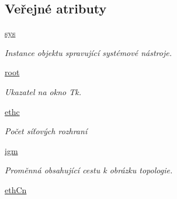 \subsection*{Veřejné atributy}
\begin{DoxyCompactItemize}
\item 
\hypertarget{classcloseSetup_1_1App_a29e3a5f52ef638873f13f1e1dc3b03f2}{\hyperlink{classcloseSetup_1_1App_a29e3a5f52ef638873f13f1e1dc3b03f2}{sys}}\label{df/df9/classcloseSetup_1_1App_a29e3a5f52ef638873f13f1e1dc3b03f2}

\begin{DoxyCompactList}\small\item\em Instance objektu spravující systémové nástroje. \end{DoxyCompactList}\item 
\hypertarget{classcloseSetup_1_1App_aa89fd74d63463734d14e222fe2296815}{\hyperlink{classcloseSetup_1_1App_aa89fd74d63463734d14e222fe2296815}{root}}\label{df/df9/classcloseSetup_1_1App_aa89fd74d63463734d14e222fe2296815}

\begin{DoxyCompactList}\small\item\em Ukazatel na okno Tk. \end{DoxyCompactList}\item 
\hypertarget{classcloseSetup_1_1App_a8d30b3f58f498caf6da5a5df32f8b24a}{\hyperlink{classcloseSetup_1_1App_a8d30b3f58f498caf6da5a5df32f8b24a}{ethc}}\label{df/df9/classcloseSetup_1_1App_a8d30b3f58f498caf6da5a5df32f8b24a}

\begin{DoxyCompactList}\small\item\em Počet síťových rozhraní \end{DoxyCompactList}\item 
\hypertarget{classcloseSetup_1_1App_af865322161774fe99b14bb037fa9dc87}{\hyperlink{classcloseSetup_1_1App_af865322161774fe99b14bb037fa9dc87}{igm}}\label{df/df9/classcloseSetup_1_1App_af865322161774fe99b14bb037fa9dc87}

\begin{DoxyCompactList}\small\item\em Proměnná obsahující cestu k obrázku topologie. \end{DoxyCompactList}\item 
\hypertarget{classcloseSetup_1_1App_a9bfeb9f737a935b2489732ac5940af55}{\hyperlink{classcloseSetup_1_1App_a9bfeb9f737a935b2489732ac5940af55}{eth\-Cn}}\label{df/df9/classcloseSetup_1_1App_a9bfeb9f737a935b2489732ac5940af55}


\end{DoxyCompactItemize}
